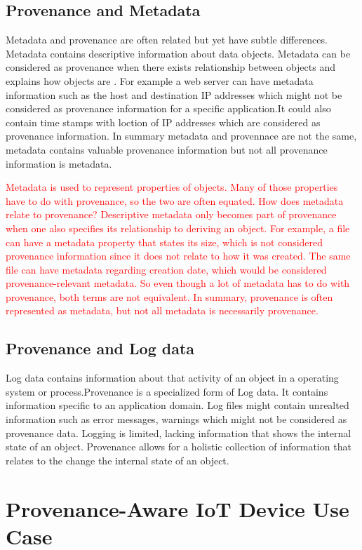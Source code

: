 \subsection{Provenance and Metadata}
Metadata and provenance are often related but yet have subtle differences. Metadata contains descriptive information about data objects. Metadata can be considered as provenance when there exists relationship between objects and explains how objects are . For example a web server can have metadata information such as the host and destination IP addresses which might not be considered as provenance information for a specific application.It could also contain time stamps with loction of IP addresses which are considered as provenance information. In summary metadata and provennace are not the same, metadata contains valuable  provenance information but not all provenance information is metadata. 


\textcolor{red}{Metadata is used to represent properties of objects. Many of those properties have to do with provenance, so the two are often equated. How does metadata relate to provenance?
Descriptive metadata only becomes part of provenance when one also specifies its relationship to deriving an object. For example, a file can have a metadata property that states its size, which is not considered provenance information since it does not relate to how it was created. The same file can have metadata regarding creation date, which would be considered provenance-relevant metadata. So even though a lot of metadata has to do with provenance, both terms are not equivalent. In summary, provenance is often represented as metadata, but not all metadata is necessarily provenance.}


\subsection{Provenance and Log data}
Log data contains information about that activity of an object in a operating system or process.Provenance is a specialized form of Log data. It contains information specific to an application domain. Log files might contain unrealted information such as error messages, warnings which might not be considered as provenance data. Logging is limited, lacking information that shows the internal state of an object. Provenance allows for a holistic collection of information that relates to the change the internal state of an object.

\section{Provenance-Aware IoT Device Use Case}

